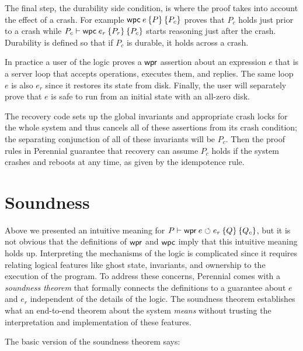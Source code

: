The final step, the durability side condition, is where the proof takes into
account the effect of a crash. For example $\wpc{e}{P}{P_{c}}$ proves that
$P_{c}$ holds just prior to a crash while
$P_{c} \proves \wpc{e_{r}}{P_{r}}{P_{c}}$ starts reasoning just after the crash.
Durability is defined so that if $P_{c}$ is durable, it holds across a crash.

In practice a user of the logic proves a $\textsf{\upshape wpr}$ assertion about an expression $e$
that is a server loop that accepts operations, executes them, and replies. The
same loop $e$ is also $e_{r}$ since it restores its state from disk. Finally,
the user will separately prove that $e$ is safe to run from an initial state
with an all-zero disk.

The recovery code sets up the global invariants and appropriate crash locks for
the whole system and thus cancels all of these assertions from its crash
condition; the separating conjunction of all of these invariants will be
$P_{c}$. Then the proof rules in Perennial guarantee that recovery can assume
$P_{c}$ holds if the system crashes and reboots at any time, as given by the
idempotence rule.

\section{Soundness}

Above we presented an intuitive meaning for $P \proves \wpr{e}{e_{r}}{Q}{Q_{c}}$, but it is
not obvious that the definitions of $\textsf{\upshape wpr}$ and $\textsf{\upshape wpc}$ imply that this
intuitive meaning holds up. Interpreting the mechanisms of the logic is
complicated since it requires relating logical features like ghost state,
invariants, and ownership to the execution of the program. To address these
concerns, Perennial comes with a \emph{soundness theorem} that formally connects
the definitions to a guarantee about $e$ and $e_{r}$ independent of the details
of the logic. The soundness theorem establishes what an end-to-end theorem about
the system \emph{means} without trusting the interpretation and implementation
of these features.

The basic version of the soundness theorem says:

\newcommand{\bigast}{\mathop{\scalebox{3}{\raisebox{-0.3ex}{$\ast$}}}}

